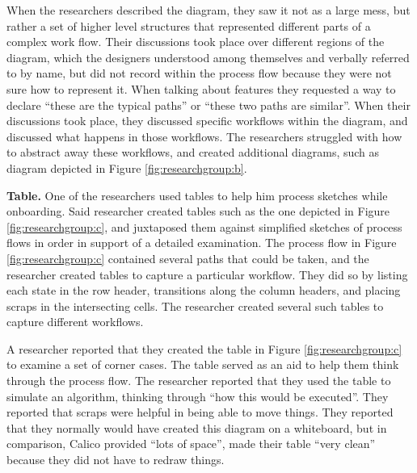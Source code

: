 When the researchers described the diagram, they saw it not as a large mess, but rather a set of higher level structures that represented different parts of a complex work flow. Their discussions took place over different regions of the diagram, which the designers understood among themselves and verbally referred to by name, but did not record within the process flow because they were not sure how to represent it. When talking about features they requested a way to declare ``these are the typical paths'' or ``these two paths are similar''. When their discussions took place, they discussed specific workflows within the diagram, and discussed what happens in those workflows. The researchers struggled with how to abstract away these workflows, and created additional diagrams, such as diagram depicted in Figure \ref{fig:researchgroup:b}.




\textbf{Table. } One of the researchers used tables to help him process sketches while onboarding. Said researcher created tables such as the one depicted in Figure \ref{fig:researchgroup:c}, and juxtaposed them against simplified sketches of process flows in order in support of a detailed examination. The process flow in Figure \ref{fig:researchgroup:c} contained several paths that could be taken, and the researcher created tables to capture a particular workflow. They did so by listing each state in the row header, transitions along the column headers, and placing scraps in the intersecting cells. The researcher created several such tables to capture different workflows.

A researcher reported that they created the table in Figure \ref{fig:researchgroup:c} to examine a set of corner cases. The table served as an aid to help them think through the process flow. The researcher reported that they used the table to simulate an algorithm, thinking through ``how this would be executed''. They reported that scraps were helpful in being able to move things. They reported that they normally would have created this diagram on a whiteboard, but in comparison, Calico provided ``lots of space'', made their table ``very clean'' because they did not have to redraw things. 

